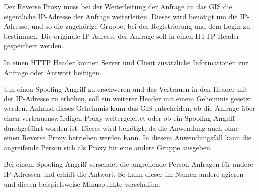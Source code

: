 Der Reverse Proxy muss bei der Weiterleitung der Anfrage an das GIS die eigentliche IP-Adresse der Anfrage weiterleiten. Dieses wird benötigt um die IP-Adresse, und so die zugehörige Gruppe, bei der Registrierung und dem Login zu bestimmen. Die originale IP-Adresse der Anfrage soll in einen HTTP Header gespeichert werden.

In einen HTTP Header können Server und Client zusätzliche Informationen zur Anfrage oder Antwort beifügen.\cite{mdncontributorsHTTPHeaders2020}

Um einen Spoofing-Angriff zu erschweren und das Vertrauen in den Header mit der IP-Adresse zu erhöhen, soll ein weiterer Header mit einem Geheimnis gesetzt werden. Anhand dieses Geheimnis kann das GIS entscheiden, ob die Anfrage über einen vertrauenswürdigen Proxy weitergeleitet oder ob ein Spoofing-Angriff durchgeführt worden ist. Dieses wird benötigt, da die Anwendung auch ohne einen Reverse Proxy betrieben werden kann. In diesem Anwendungsfall kann die angreifende Person sich als Proxy für eine andere Gruppe ausgeben.

Bei einem Spoofing-Angriff versendet die angreifende Person Anfragen für andere IP-Adressen und erhält die Antwort. So kann dieser im Namen andere agieren und diesen beispielsweise Minuspunkte verschaffen.